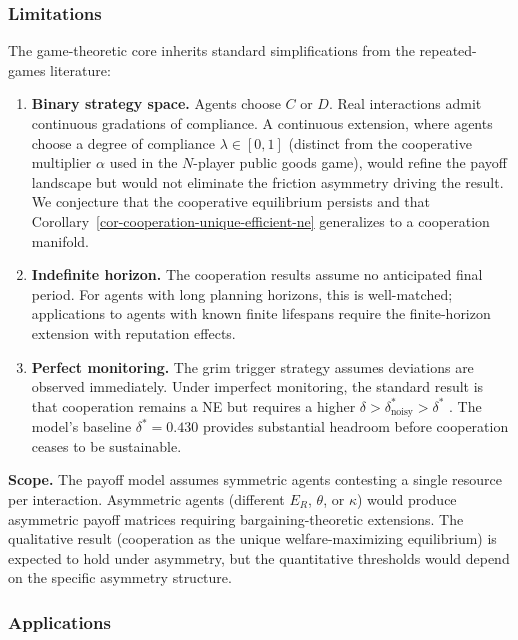 \documentclass[11pt]{article}
\theoremstyle{plain}
\theoremstyle{definition}
\theoremstyle{remark}
\let\origsubsubsection\subsubsection
\renewcommand{\subsubsection}{\needspace{4\baselineskip}\origsubsubsection}
\begin{document}
\subsubsection{Limitations}\label{limitations-4}

The game-theoretic core inherits standard simplifications from the
repeated-games literature:

\begin{enumerate}
\def\labelenumi{\arabic{enumi}.}
\item
  \textbf{Binary strategy space.} Agents choose \(C\) or \(D\). Real
  interactions admit continuous gradations of compliance. A continuous
  extension, where agents choose a degree of compliance
  \(\lambda \in [0,1]\) (distinct from the cooperative multiplier
  \(\alpha\) used in the \(N\)-player public goods game), would refine
  the payoff landscape but would not eliminate the friction asymmetry
  driving the result. We conjecture that the cooperative equilibrium
  persists and that Corollary~\ref{cor-cooperation-unique-efficient-ne}
  generalizes to a cooperation manifold.
\item
  \textbf{Indefinite horizon.} The cooperation results assume no
  anticipated final period. For agents with long planning horizons, this
  is well-matched; applications to agents with known finite lifespans
  require the finite-horizon extension with reputation effects.
\item
  \textbf{Perfect monitoring.} The grim trigger strategy assumes
  deviations are observed immediately. Under imperfect monitoring, the
  standard result is that cooperation remains a NE but requires a higher
  \(\delta > \delta^*_{\text{noisy}} > \delta^*\)
  \citep{GreenPorter1984, Fudenberg1991}. The model's baseline
  \(\delta^* = 0.430\) provides substantial headroom before cooperation
  ceases to be sustainable.
\end{enumerate}

\textbf{Scope.} The payoff model assumes symmetric agents contesting a
single resource per interaction. Asymmetric agents (different \(E_R\),
\(\theta\), or \(\kappa\)) would produce asymmetric payoff matrices
requiring bargaining-theoretic extensions. The qualitative result
(cooperation as the unique welfare-maximizing equilibrium) is expected
to hold under asymmetry, but the quantitative thresholds would depend on
the specific asymmetry structure.

\subsubsection{Applications}\label{applications-4}
\end{document}
